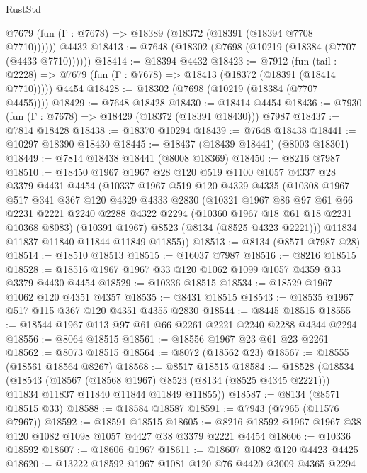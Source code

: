 \begin{lexlean}{RustStd}
\begin{coremodule}
{\begin{coremodule}
{{{{{{{{{{{{{{{{{{{{{{{{{{{{{{{{{{{{{{{{{{{{{{{{{{{{{      @7679 (fun (Γ : @7678) => @18389 (@18372 (@18391 (@18394 @7708 @7710))))))
    @4432
@18413 := @7648 (@18302 (@7698 (@10219 (@18384 (@7707 (@4433 @7710))))))
@18414 := @18394 @4432
@18423 := @7912
    (fun (tail : @2228) => @7679 (fun (Γ : @7678) => @18413 (@18372 (@18391 (@18414 @7710)))))
    @4454
@18428 := @18302 (@7698 (@10219 (@18384 (@7707 @4455))))
@18429 := @7648 @18428
@18430 := @18414 @4454
@18436 := @7930 (fun (Γ : @7678) => @18429 (@18372 (@18391 @18430))) @7987
@18437 := @7814 @18428
@18438 := @18370 @10294
@18439 := @7648 @18438
@18441 := @10297 @18390 @18430
@18445 := @18437 (@18439 @18441) (@8003 @18301)
@18449 := @7814 @18438 @18441 (@8008 @18369)
@18450 := @8216 @7987
@18510 := @18450
    @1967
    @1967
    @28
    @120
    @519
    @1100
    @1057
    @4337
    @28
    @3379
    @4431
    @4454
    (@10337
      @1967
      @519
      @120
      @4329
      @4335
      (@10308
        @1967
        @517
        @341
        @367
        @120
        @4329
        @4333
        @2830
        (@10321
          @1967
          @86
          @97
          @61
          @66
          @2231
          @2221
          @2240
          @2288
          @4322
          @2294
          (@10360 @1967 @18 @61 @18 @2231 @10368 @8083)
          (@10391 @1967)
          @8523
          (@8134 (@8525 @4323 @2221)))
        @11834
        @11837
        @11840
        @11844
        @11849
        @11855))
@18513 := @8134 (@8571 @7987 @28)
@18514 := @18510 @18513
@18515 := @16037 @7987
@18516 := @8216 @18515
@18528 := @18516 @1967 @1967 @33 @120 @1062 @1099 @1057 @4359 @33 @3379 @4430 @4454
@18529 := @10336 @18515
@18534 := @18529 @1967 @1062 @120 @4351 @4357
@18535 := @8431 @18515
@18543 := @18535 @1967 @517 @115 @367 @120 @4351 @4355 @2830
@18544 := @8445 @18515
@18555 := @18544 @1967 @113 @97 @61 @66 @2261 @2221 @2240 @2288 @4344 @2294
@18556 := @8064 @18515
@18561 := @18556 @1967 @23 @61 @23 @2261
@18562 := @8073 @18515
@18564 := @8072 (@18562 @23)
@18567 := @18555 (@18561 @18564 @8267)
@18568 := @8517 @18515
@18584 := @18528
    (@18534
      (@18543
        (@18567 (@18568 @1967) @8523 (@8134 (@8525 @4345 @2221)))
        @11834
        @11837
        @11840
        @11844
        @11849
        @11855))
@18587 := @8134 (@8571 @18515 @33)
@18588 := @18584 @18587
@18591 := @7943 (@7965 (@11576 @7967))
@18592 := @18591 @18515
@18605 := @8216 @18592 @1967 @1967 @38 @120 @1082 @1098 @1057 @4427 @38 @3379 @2221 @4454
@18606 := @10336 @18592
@18607 := @18606 @1967
@18611 := @18607 @1082 @120 @4423 @4425
@18620 := @13222 @18592 @1967 @1081 @120 @76 @4420 @3009 @4365 @2294
}}}}}}}}}}}}}}}}}}}}}}}}}}}}}}}}}}}}}}}}}}}}}}}}}}}}}
\end{coremodule}}
\end{coremodule}
\end{lexlean}
